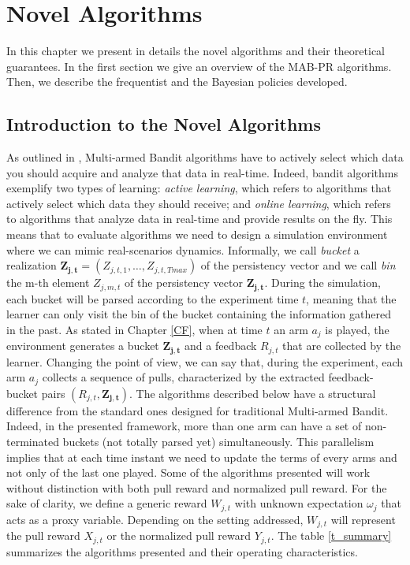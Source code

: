 \chapter{Novel Algorithms}\label{C10}
In this chapter we present in details the novel algorithms and their theoretical guarantees. In the first section we give an overview of the MAB-PR algorithms. Then, we describe the frequentist and the Bayesian policies developed.


\section{Introduction to the Novel Algorithms}

As outlined in \cite{banditalgowebopt}, Multi-armed Bandit algorithms have to actively select which data you should acquire and analyze that data in real-time. Indeed, bandit algorithms exemplify two types of learning: \emph{active learning}, which refers to algorithms that actively select which data they should receive; and \emph{online learning}, which refers to algorithms that analyze data in real-time and provide results on the fly. This means that to evaluate algorithms we need to design a simulation environment where we can mimic real-scenarios dynamics. Informally, we call \emph{bucket} a realization $\boldsymbol{Z_{j,t}}= (Z_{j,t,1},\dots, Z_{j,t,Tmax})$ of the persistency vector and we call \emph{bin}  the m-th element  $Z_{j,m,t}$  of the persistency vector $\boldsymbol{Z_{j,t}}$.   During the simulation, each bucket will be parsed according to the experiment time $t$, meaning that the learner can only visit the bin of the bucket containing the information gathered in the past. As stated in Chapter \ref{CF}, when at time $t$ an arm $a_j$ is played, the environment generates a bucket $\boldsymbol{Z_{j,t}}$ and a feedback $R_{j,t}$ that are collected by the learner.
Changing the point of view, we can say that, during the experiment, each arm $a_j$ collects a sequence of pulls, characterized by the extracted feedback-bucket pairs $(R_ {j, t}, \boldsymbol{Z_ {j, t}})$. The algorithms described below have a structural difference from the standard ones designed for traditional Multi-armed Bandit. Indeed, in the presented framework, more than one arm can have a set of non-terminated buckets (not totally parsed yet) simultaneously.  This parallelism implies that at each time instant we need to update the terms of every arms and not only of the last one played. Some of the algorithms presented will work without distinction with both pull reward and normalized pull reward.  For the sake of clarity, we define a generic reward $W_{j,t}$ with unknown expectation $\omega_j$ that acts as a proxy variable. Depending on the setting addressed, $W_{j,t}$ will represent the pull reward $X_{j,t}$ or the normalized pull reward $Y_{j,t}$. The table \ref{t_summary} summarizes the algorithms presented and their operating characteristics.

